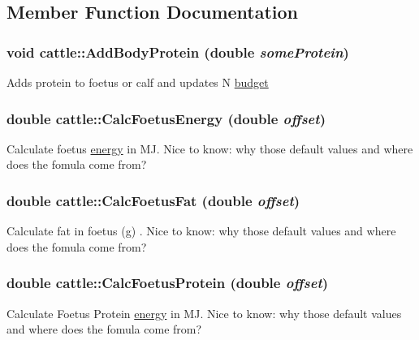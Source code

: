 \subsection{Member Function Documentation}
\hypertarget{classcattle_af266fc5caa824f4449d443228c39bd9c}{
\subsubsection[{AddBodyProtein}]{\setlength{\rightskip}{0pt plus 5cm}void cattle::AddBodyProtein (double {\em someProtein})}}
\label{classcattle_af266fc5caa824f4449d443228c39bd9c}
Adds protein to foetus or calf and updates N \hyperlink{classbudget}{budget} \hypertarget{classcattle_ab26f4af3dee792b5979ef58083c46f58}{
\subsubsection[{CalcFoetusEnergy}]{\setlength{\rightskip}{0pt plus 5cm}double cattle::CalcFoetusEnergy (double {\em offset})}}
\label{classcattle_ab26f4af3dee792b5979ef58083c46f58}
Calculate foetus \hyperlink{classenergy}{energy} in MJ. Nice to know: why those default values and where does the fomula come from? \hypertarget{classcattle_ad24d13fc2005a194019309ce8f47f7d2}{
\subsubsection[{CalcFoetusFat}]{\setlength{\rightskip}{0pt plus 5cm}double cattle::CalcFoetusFat (double {\em offset})}}
\label{classcattle_ad24d13fc2005a194019309ce8f47f7d2}
Calculate fat in foetus (g) . Nice to know: why those default values and where does the fomula come from? \hypertarget{classcattle_a8643521d1530588eeff5d92013063038}{
\subsubsection[{CalcFoetusProtein}]{\setlength{\rightskip}{0pt plus 5cm}double cattle::CalcFoetusProtein (double {\em offset})}}
\label{classcattle_a8643521d1530588eeff5d92013063038}
Calculate Foetus Protein \hyperlink{classenergy}{energy} in MJ. Nice to know: why those default values and where does the fomula come from? 

